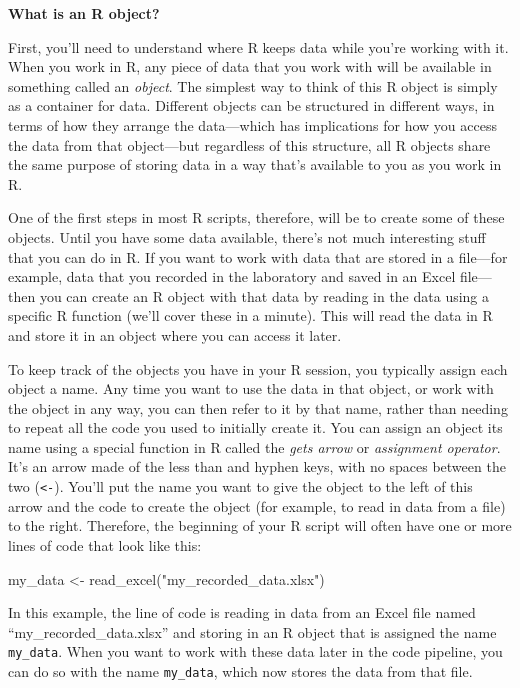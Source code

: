 \documentclass[]{tufte-book}
\newenvironment{Shaded}{}{}
\newcommand{\FunctionTok}[1]{\textcolor[rgb]{0.02,0.16,0.49}{#1}}
\newcommand{\NormalTok}[1]{#1}
\newcommand{\OtherTok}[1]{\textcolor[rgb]{0.00,0.44,0.13}{#1}}
\newcommand{\StringTok}[1]{\textcolor[rgb]{0.25,0.44,0.63}{#1}}
\begin{document}
\textbf{What is an R object?}

First, you'll need to understand where R keeps data while you're working with
it. When you work in R, any piece of data that you work with will be available
in something called an \emph{object}. The simplest way to think of this R object is
simply as a container for data. Different objects can be structured in different
ways, in terms of how they arrange the data---which has implications for how
you access the data from that object---but regardless of this structure, all
R objects share the same purpose of storing data in a way that's available to
you as you work in R.

One of the first steps in most R scripts, therefore, will be to create some of
these objects. Until you have some data available, there's not much interesting
stuff that you can do in R. If you want to work with data that are stored in a
file---for example, data that you recorded in the laboratory and saved in an
Excel file---then you can create an R object with that data by reading in the
data using a specific R function (we'll cover these in a minute). This will read
the data in R and store it in an object where you can access it later.

To keep track of the objects you have in your R session, you typically assign
each object a name. Any time you want to use the data in that object, or work
with the object in any way, you can then refer to it by that name, rather than
needing to repeat all the code you used to initially create it. You can assign
an object its name using a special function in R called the \emph{gets arrow} or
\emph{assignment operator}. It's an arrow made of the less than and hyphen keys, with
no spaces between the two (\texttt{\textless{}-}). You'll put the name you want to give the object
to the left of this arrow and the code to create the object (for example, to read
in data from a file) to the right. Therefore, the beginning of your R script
will often have one or more lines of code that look like this:

\begin{Shaded}
\begin{Highlighting}[]
\NormalTok{my\_data }\OtherTok{\textless{}{-}} \FunctionTok{read\_excel}\NormalTok{(}\StringTok{"my\_recorded\_data.xlsx"}\NormalTok{)}
\end{Highlighting}
\end{Shaded}

In this example, the line of code is reading in data from an Excel file named
``my\_recorded\_data.xlsx'' and storing in an R object that is assigned the name
\texttt{my\_data}. When you want to work with these data later in the code pipeline, you
can do so with the name \texttt{my\_data}, which now stores the data from that file.
\end{document}
